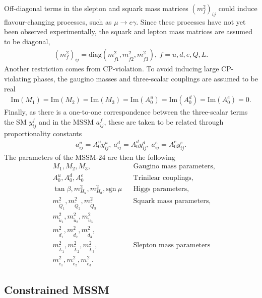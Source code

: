 \documentclass[twoside,english]{uiofysmaster}
\begin{document}
{Off-diagonal terms in the slepton and squark mass matrices $(m_f^2)_{ij}$ could induce flavour-changing processes, such as $\mu \rightarrow e \gamma$. Since these processes have not yet been observed experimentally, the squark and lepton mass matrices are assumed to be diagonal,
\begin{align}
(m_f^2)_{ij} = \text{diag}(m_{\widetilde{f}1}^2, m_{\widetilde{f}2}^2, m_{\widetilde{f}3}^2), ~f = u, d, e, Q, L.
\end{align}
Another restriction comes from CP-violation. To avoid inducing large CP-violating phases, the gaugino masses and three-scalar couplings are assumed to be real
\begin{align}
\text{Im}(M_1) = \text{Im}(M_2) = \text{Im} (M_3) = \text{Im} (A_0^u) = \text{Im} (A_0^d) = \text{Im} (A_0^e) = 0.
\end{align}
Finally, as there is a one-to-one correspondence between the three-scalar terms the SM $y_{ij}^f$ and in the MSSM $a^f_{ij}$, these are taken to be related through proportionality constants
\begin{align}
a^u_{ij} = A_0^uy_{ij}^u, ~a^d_{ij} = A_0^dy_{ij}^d, ~a^e_{ij} = A_0^ey_{ij}^e.
\end{align}
 The parameters of the MSSM-24 are then the following
\begin{align}
&M_1, M_2, M_3, && \text{Gaugino mass parameters,} \nonumber \\
&A_0^u, A_0^d, A_0^e && \text{Trinilear couplings,} \nonumber\\
&\tan \beta,m_{H_u}^2,m_{H_d}^2, \text{sgn}~ \mu && \text{Higgs parameters,} \nonumber\\
& m_{\widetilde{Q}_1}^2, m_{\widetilde{Q}_2}^2, m_{\widetilde{Q}_3}^2 && \text{Squark mass parameters,}\nonumber\\
& m_{\widetilde{u}_1}^2, m_{\widetilde{u}_2}^2, m_{\widetilde{u}_3}^2\nonumber\\
&m_{\widetilde{d}_1}^2, m_{\widetilde{d}_2}^2, m_{\widetilde{d}_3}^2,\nonumber\\
& m_{\widetilde{L}_1}^2, m_{\widetilde{L}_2}^2, m_{\widetilde{L}_3}^2, &&\text{Slepton mass parameters}\nonumber\\
& m_{\widetilde{e}_1}^2, m_{\widetilde{e}_2}^2, m_{\widetilde{e}_3}^2.\nonumber
\end{align}

\subsection{Constrained MSSM}\label{Sec:: physics back : CMSSM}

}
\end{document}
